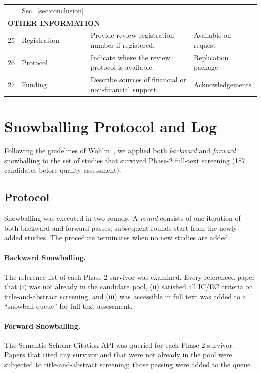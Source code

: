\begin{longtable}{p{0.4cm}p{3.5cm}p{5.5cm}p{2.5cm}}
                     & Sec.~\ref{sec:conclusion} \\[3pt]
\multicolumn{4}{l}{\textbf{OTHER INFORMATION}}\\
25 & Registration            & Provide review registration number if registered.
                     & Available on request \\
26 & Protocol                & Indicate where the review protocol is available.
                     & Replication package \\
27 & Funding                 & Describe sources of financial or non-financial support.
                     & Acknowledgements \\
\end{longtable}

\section{Snowballing Protocol and Log}
\label{appendix:snowballing}

Following the guidelines of Wohlin~\cite{wohlin2014snowballing}, we applied both
\emph{backward} and \emph{forward} snowballing to the set of studies that survived
Phase-2 full-text screening (187 candidates before quality assessment).

\subsection*{Protocol}

Snowballing was executed in two rounds.  A \emph{round} consists of one iteration of
both backward and forward passes; subsequent rounds start from the newly added studies.
The procedure terminates when no new studies are added.

\paragraph{Backward Snowballing.}
The reference list of each Phase-2 survivor was examined.  Every referenced paper that
(i) was not already in the candidate pool, (ii) satisfied all IC/EC criteria on
title-and-abstract screening, and (iii) was accessible in full text was added to a
``snowball queue'' for full-text assessment.

\paragraph{Forward Snowballing.}
The Semantic Scholar Citation API was queried for each Phase-2 survivor.  Papers that
cited any survivor and that were not already in the pool were subjected to title-and-abstract
screening; those passing were added to the queue.


